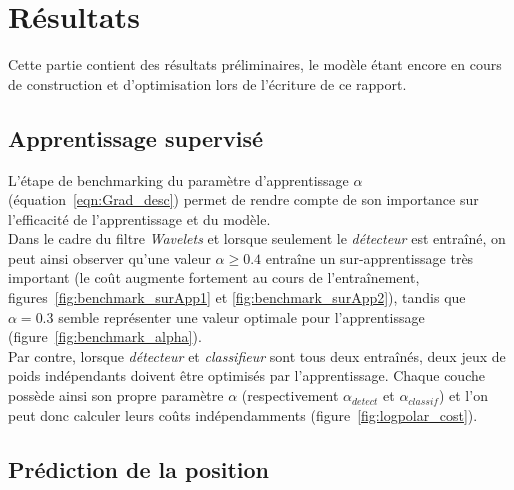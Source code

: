 
\chapter{Résultats} %
 
\label{Résultats} %


Cette partie contient des résultats préliminaires, le modèle étant encore en cours de construction et d'optimisation lors de l'écriture de ce rapport.

\section{Apprentissage supervisé}

L'étape de benchmarking du paramètre d'apprentissage $\alpha$ (équation~\ref{eqn:Grad_desc}) permet de rendre compte de son importance sur l'efficacité de l'apprentissage et du modèle. \\
Dans le cadre du filtre \textit{Wavelets} et lorsque seulement le \textit{détecteur} est entraîné, on peut ainsi observer qu'une valeur $\alpha\geq0.4$ entraîne un sur-apprentissage très important (le coût augmente fortement au cours de l'entraînement, figures~\ref{fig:benchmark_surApp1} et \ref{fig:benchmark_surApp2}), tandis que $\alpha=0.3$ semble représenter une valeur optimale pour l'apprentissage (figure~\ref{fig:benchmark_alpha}).\\
Par contre, lorsque \textit{détecteur} et \textit{classifieur} sont tous deux entraînés, deux jeux de poids indépendants doivent être optimisés par l'apprentissage. Chaque couche possède ainsi son propre paramètre $\alpha$ (respectivement $\alpha_{detect}$ et $\alpha_{classif}$) et l'on peut donc calculer leurs coûts indépendamments (figure~\ref{fig:logpolar_cost}).


\section{Prédiction de la position}

